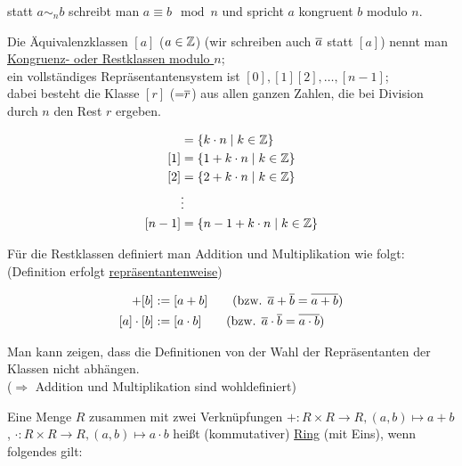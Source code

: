 statt $a\sim_nb$ schreibt man $a\equiv b \mod n$ und spricht {\flqq $a$ kongruent $b$ modulo $n$\frqq}.

Die Äquivalenzklassen $[a]$ ($a\in\mathbb{Z}$) (wir schreiben auch $\overline{a}$ statt $[a]$) nennt man \\\ul{Kongruenz- oder Restklassen modulo $n$};\\
ein vollständiges Repräsentantensystem ist $[0],[1][2],\ldots,[n-1]$;\\
dabei besteht die Klasse $[r]$ (=$\overline{r}$) aus allen ganzen Zahlen, die bei Division durch $n$ den Rest $r$ ergeben.

\begin{align*}
[0] &= \{k\cdot n\mid k\in\Z\}\\
[1] &= \{1+k\cdot n\mid k\in\Z\}\\
[2] &= \{2+k\cdot n\mid k\in\Z\}\\
&\vdots\\
[n-1] &= \{n-1+k\cdot n\mid k\in\Z\}\\
\end{align*}

Für die Restklassen definiert man Addition und Multiplikation wie folgt: (Definition erfolgt \ul{repräsentantenweise})

\begin{align*}
[a]+[b]&:=[a+b]\qquad (\text{bzw. }\ol{a}+\ol{b}= \ol{a+b})\\
[a]\cdot[b]&:=[a\cdot b]\qquad (\text{bzw. }\ol{a}\cdot\ol{b}= \ol{a\cdot b})\\
\end{align*}

Man kann zeigen, dass die Definitionen von der Wahl der Repräsentanten der Klassen nicht abhängen.\\
($\Rightarrow$ Addition und Multiplikation sind wohldefiniert)



\Def Eine Menge $R$ zusammen mit zwei Verknüpfungen $+:R\times R\to R,(a,b)\mapsto a+b$, $\cdot:R\times R\to R,(a,b)\mapsto a\cdot b$ heißt (kommutativer) \ul{Ring} (mit Eins), wenn folgendes gilt:

